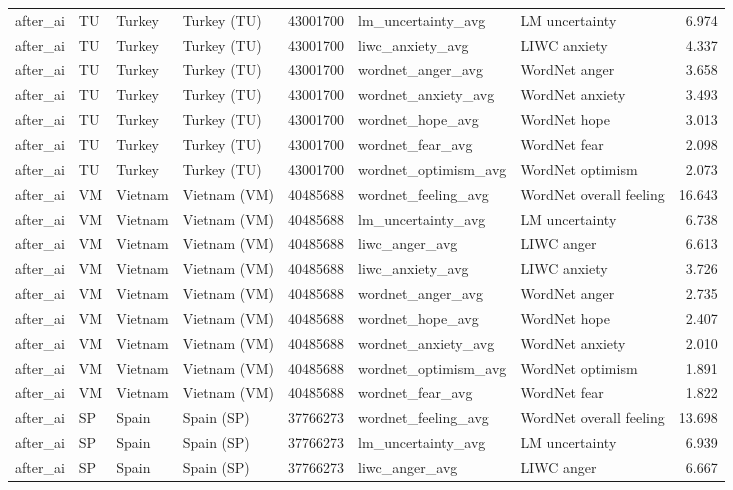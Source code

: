 \begin{tabular}{llllrllr}
after\_ai & TU & Turkey & Turkey (TU) & 43001700 & lm\_uncertainty\_avg & LM uncertainty & 6.974 \\
after\_ai & TU & Turkey & Turkey (TU) & 43001700 & liwc\_anxiety\_avg & LIWC anxiety & 4.337 \\
after\_ai & TU & Turkey & Turkey (TU) & 43001700 & wordnet\_anger\_avg & WordNet anger & 3.658 \\
after\_ai & TU & Turkey & Turkey (TU) & 43001700 & wordnet\_anxiety\_avg & WordNet anxiety & 3.493 \\
after\_ai & TU & Turkey & Turkey (TU) & 43001700 & wordnet\_hope\_avg & WordNet hope & 3.013 \\
after\_ai & TU & Turkey & Turkey (TU) & 43001700 & wordnet\_fear\_avg & WordNet fear & 2.098 \\
after\_ai & TU & Turkey & Turkey (TU) & 43001700 & wordnet\_optimism\_avg & WordNet optimism & 2.073 \\
after\_ai & VM & Vietnam & Vietnam (VM) & 40485688 & wordnet\_feeling\_avg & WordNet overall feeling & 16.643 \\
after\_ai & VM & Vietnam & Vietnam (VM) & 40485688 & lm\_uncertainty\_avg & LM uncertainty & 6.738 \\
after\_ai & VM & Vietnam & Vietnam (VM) & 40485688 & liwc\_anger\_avg & LIWC anger & 6.613 \\
after\_ai & VM & Vietnam & Vietnam (VM) & 40485688 & liwc\_anxiety\_avg & LIWC anxiety & 3.726 \\
after\_ai & VM & Vietnam & Vietnam (VM) & 40485688 & wordnet\_anger\_avg & WordNet anger & 2.735 \\
after\_ai & VM & Vietnam & Vietnam (VM) & 40485688 & wordnet\_hope\_avg & WordNet hope & 2.407 \\
after\_ai & VM & Vietnam & Vietnam (VM) & 40485688 & wordnet\_anxiety\_avg & WordNet anxiety & 2.010 \\
after\_ai & VM & Vietnam & Vietnam (VM) & 40485688 & wordnet\_optimism\_avg & WordNet optimism & 1.891 \\
after\_ai & VM & Vietnam & Vietnam (VM) & 40485688 & wordnet\_fear\_avg & WordNet fear & 1.822 \\
after\_ai & SP & Spain & Spain (SP) & 37766273 & wordnet\_feeling\_avg & WordNet overall feeling & 13.698 \\
after\_ai & SP & Spain & Spain (SP) & 37766273 & lm\_uncertainty\_avg & LM uncertainty & 6.939 \\
after\_ai & SP & Spain & Spain (SP) & 37766273 & liwc\_anger\_avg & LIWC anger & 6.667 \\

\end{tabular}
